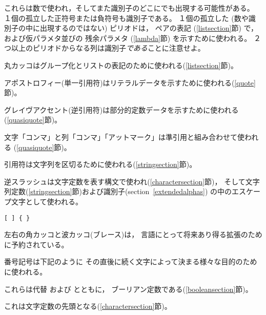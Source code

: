 \begin{description}{}{}

\item[{\tt.\ + -}]
これらは数で使われ，そしてまた識別子のどこにでも出現する可能性がある。
１個の孤立した正符号または負符号も識別子である。
１個の孤立した (数や識別子の中に出現するのではない) ピリオドは，
ペアの表記 (\ref{listsection}節) で，および仮パラメタ並びの
残余パラメタ (\ref{lambda}節) を示すために使われる。
２つ以上のピリオドからなる列は識別子{\em である}ことに注意せよ。

\item[\tt( )]
丸カッコはグループ化とリストの表記のために使われる(\ref{listsection}節)。

\item[\singlequote]
アポストロフィー(単一引用符)はリテラルデータを示すために使われる(\ref{quote}節)。

\item[\backquote]
グレイヴアクセント(逆引用符)は部分的定数データを示すために使われる(\ref{quasiquote}節)。

\item[\tt, ,@]
文字「コンマ」と列「コンマ」「アットマーク」は準引用と組み合わせて使われる
(\ref{quasiquote}節)。

\item[\tt"]
引用符は文字列を区切るために使われる(\ref{stringsection}節)。

\item[\backwhack]
逆スラッシュは文字定数を表す構文で使われ(\ref{charactersection}節)，
そして文字列定数(\ref{stringsection}節)および識別子(section~\ref{extendedalphas})
の中のエスケープ文字として使われる。

\hbox{\tt \verb"[" \verb"]" \verb"{" \verb"}"}
\item[\copy0]
左右の角カッコと波カッコ(ブレース)は，
言語にとって将来あり得る拡張のために予約されている。

\item[\sharpsign] 番号記号は下記のように
その直後に続く文字によって決まる様々な目的のために使われる。

\item[\schtrue{} \schfalse{}]
これらは代替  および  とともに，
ブーリアン定数である(\ref{booleansection}節)。

\item[\sharpsign\backwhack]
これは文字定数の先頭となる(\ref{charactersection}節)。


\end{description}
